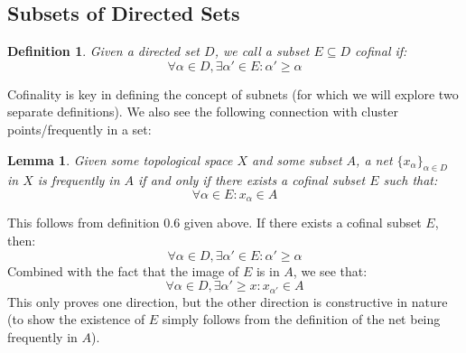 \documentclass[10pt,letterpaper]{article} %
\newtheorem{lem}{Lemma}[section]
\newtheorem{defn}{Definition}[section]
\begin{document}

\subsection{Subsets of Directed Sets}
\begin{defn}
Given a directed set $D$, we call a subset $E \subseteq D$ cofinal if:
\begin{equation*}
\forall \alpha \in D, \exists \alpha' \in E: \alpha' \geq \alpha
\end{equation*}
\end{defn}
Cofinality is key in defining the concept of subnets (for which we will explore two separate definitions). We also see the following connection with cluster points/frequently in a set:
\begin{lem}
Given some topological space $X$ and some subset $A$, a net $\{x_\alpha\}_{\alpha \in D}$ in $X$ is frequently in $A$ if and only if there exists a cofinal subset $E$ such that:
\begin{equation*}
\forall \alpha \in E: x_\alpha \in A
\end{equation*}
\end{lem}
This follows from definition 0.6 given above. If there exists a cofinal subset $E$, then:
\begin{equation*}
\forall \alpha \in D, \exists \alpha' \in E: \alpha' \geq \alpha
\end{equation*}
Combined with the fact that the image of $E$ is in $A$, we see that:
\begin{equation*}
\forall \alpha \in D, \exists \alpha' \geq x: x_{\alpha'} \in A
\end{equation*}
This only proves one direction, but the other direction is constructive in nature (to show the existence of $E$ simply follows from the definition of the net being frequently in $A$).\\
\end{document}
